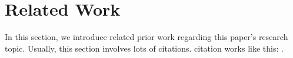 \section{Related Work}
\label{sec:related}

In this section, we introduce related prior work regarding this paper's research topic. Usually, this section involves lots of citations.
citation works like this: \cite{adams_davies_2009}.
